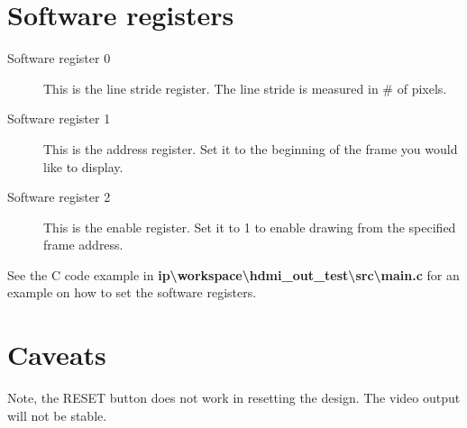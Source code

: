 \documentclass[12pt]{article}
\begin{document}
  \section{Software registers}
  \begin{description}
    \item[Software register 0] This is the line stride register. The line stride is measured in \# of pixels.
    \item[Software register 1] This is the address register. Set it to the beginning of the frame you would like to display.
    \item[Software register 2] This is the enable register. Set it to 1 to enable drawing from the specified frame address.
  \end{description}
  See the C code example in \textbf {ip\textbackslash{}workspace\textbackslash{}hdmi\_out\_test\textbackslash{}src\textbackslash{}main.c} for an example on how to set the software registers.
  \section{Caveats}
  Note, the RESET button does not work in resetting the design. The video output will not be stable.
\end{document}
